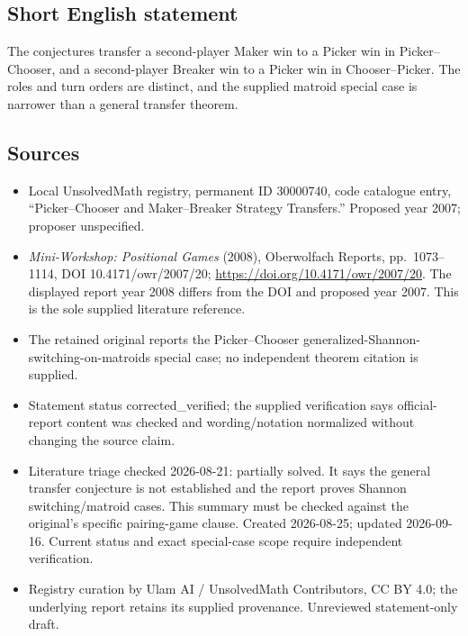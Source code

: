 \documentclass[11pt]{article}
\begin{document}
\subsection{Short English statement}
The conjectures transfer a second-player Maker win to a Picker win in Picker--Chooser, and a second-player Breaker win to a Picker win in Chooser--Picker. The roles and turn orders are distinct, and the supplied matroid special case is narrower than a general transfer theorem.
\subsection{Sources}
\begin{itemize}
\item Local UnsolvedMath registry, permanent ID 30000740, code catalogue entry, ``Picker--Chooser and Maker--Breaker Strategy Transfers.'' Proposed year 2007; proposer unspecified.
\item \emph{Mini-Workshop: Positional Games} (2008), Oberwolfach Reports, pp.\ 1073--1114, DOI 10.4171/owr/2007/20; \url{https://doi.org/10.4171/owr/2007/20}. The displayed report year 2008 differs from the DOI and proposed year 2007. This is the sole supplied literature reference.
\item The retained original reports the Picker--Chooser generalized-Shannon-switching-on-matroids special case; no independent theorem citation is supplied.
\item Statement status corrected\_verified; the supplied verification says official-report content was checked and wording/notation normalized without changing the source claim.
\item Literature triage checked 2026-08-21: partially solved. It says the general transfer conjecture is not established and the report proves Shannon switching/matroid cases. This summary must be checked against the original's specific pairing-game clause. Created 2026-08-25; updated 2026-09-16. Current status and exact special-case scope require independent verification.
\item Registry curation by Ulam AI / UnsolvedMath Contributors, CC BY 4.0; the underlying report retains its supplied provenance. Unreviewed statement-only draft.
\end{itemize}
\end{document}
